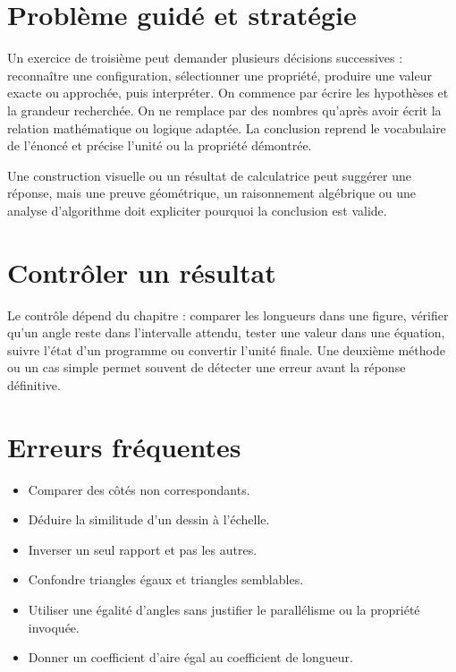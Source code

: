 \section{Problème guidé et stratégie}
Un exercice de troisième peut demander plusieurs décisions successives : reconnaître une configuration, sélectionner une propriété, produire une valeur exacte ou approchée, puis interpréter. On commence par écrire les hypothèses et la grandeur recherchée. On ne remplace par des nombres qu’après avoir écrit la relation mathématique ou logique adaptée. La conclusion reprend le vocabulaire de l’énoncé et précise l’unité ou la propriété démontrée.

\begin{attention}
Une construction visuelle ou un résultat de calculatrice peut suggérer une réponse, mais une preuve géométrique, un raisonnement algébrique ou une analyse d’algorithme doit expliciter pourquoi la conclusion est valide.
\end{attention}

\section{Contrôler un résultat}
Le contrôle dépend du chapitre : comparer les longueurs dans une figure, vérifier qu’un angle reste dans l’intervalle attendu, tester une valeur dans une équation, suivre l’état d’un programme ou convertir l’unité finale. Une deuxième méthode ou un cas simple permet souvent de détecter une erreur avant la réponse définitive.

\section{Erreurs fréquentes}
\begin{itemize}
\item Comparer des côtés non correspondants.
\item Déduire la similitude d’un dessin à l’échelle.
\item Inverser un seul rapport et pas les autres.
\item Confondre triangles égaux et triangles semblables.
\item Utiliser une égalité d’angles sans justifier le parallélisme ou la propriété invoquée.
\item Donner un coefficient d’aire égal au coefficient de longueur.
\end{itemize}

